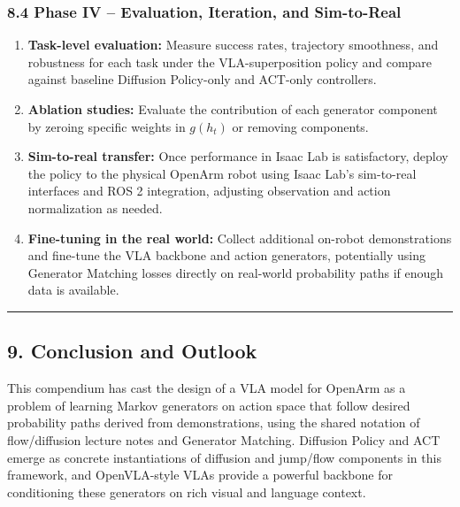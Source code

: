 \documentclass[
]{article}
\providecommand{\tightlist}{%
  \setlength{\itemsep}{0pt}\setlength{\parskip}{0pt}}
\theoremstyle{remark}
\begin{document}
\subsubsection{8.4 Phase IV -- Evaluation, Iteration, and
Sim-to-Real}\label{phase-iv-evaluation-iteration-and-sim-to-real}

\begin{enumerate}
\def\labelenumi{\arabic{enumi}.}
\tightlist
\item
  \textbf{Task-level evaluation:} Measure success rates, trajectory
  smoothness, and robustness for each task under the VLA-superposition
  policy and compare against baseline Diffusion Policy-only and ACT-only
  controllers. \cite{diffpolicy-theory-notes,act-openarm-notes,openvla-notes}
\item
  \textbf{Ablation studies:} Evaluate the contribution of each generator
  component by zeroing specific weights in \(g(h_t)\) or removing
  components. \cite{gm2025,openvla-notes}
\item
  \textbf{Sim-to-real transfer:} Once performance in Isaac Lab is
  satisfactory, deploy the policy to the physical OpenArm robot using
  Isaac Lab's sim-to-real interfaces and ROS 2 integration, adjusting
  observation and action normalization as needed. \cite{isaaclab-github,act-openarm-notes}
\item
  \textbf{Fine-tuning in the real world:} Collect additional on-robot
  demonstrations and fine-tune the VLA backbone and action generators,
  potentially using Generator Matching losses directly on real-world
  probability paths if enough data is available. \cite{gm2025,openvla-notes}
\end{enumerate}

\begin{center}\rule{0.5\linewidth}{0.5pt}\end{center}

\subsection{9. Conclusion and Outlook}\label{conclusion-and-outlook}

This compendium has cast the design of a VLA model for OpenArm as a
problem of learning Markov generators on action space that follow
desired probability paths derived from demonstrations, using the shared
notation of flow/diffusion lecture notes and Generator Matching.
Diffusion Policy and ACT emerge as concrete instantiations of diffusion
and jump/flow components in this framework, and OpenVLA-style VLAs
provide a powerful backbone for conditioning these generators on rich
visual and language
context. \cite{gm-companion-notes,act2023,lecnotes2026,diffusion-policy2023,act-openarm-notes,diffpolicy-theory-notes,gm2025,openvla-notes}
\end{document}
